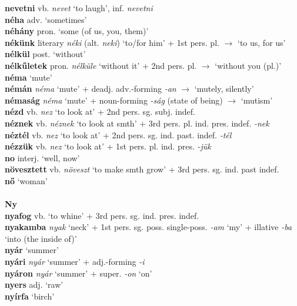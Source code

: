\documentclass[11pt]{article}
\begin{document}
\textbf{nevetni} vb. \emph{nevet} `to laugh', inf. \emph{nevetni} \\
\textbf{néha} adv. `sometimes' \\
\textbf{néhány} pron. `some (of us, you, them)' \\
\textbf{nékünk} literary \emph{néki} (alt. \emph{neki}) `to/for him' +
1st pers. pl. $\rightarrow$ `to us, for us' \\
\textbf{nélkül} post. `without' \\
\textbf{nélkűletek} pron. \emph{nélküle} `without it' + 2nd
pers. pl. $\rightarrow$ `without you (pl.)' \\
\textbf{néma} `mute' \\
\textbf{némán} \emph{néma} `mute' +
deadj. adv.\hyp{}forming \emph{-an} $\rightarrow$ `mutely, silently' \\
\textbf{némaság} \emph{néma} `mute' + noun\hyp{}forming \emph{-ság}
(state of being) $\rightarrow$ `mutism' \\
\textbf{nézd} vb. \emph{nez} `to look at' + 2nd
pers. sg. subj. indef. \\
\textbf{néznek} vb. \emph{néznek} `to look at smth' + 3rd
  pers. pl. ind. pres. indef. \emph{-nek} \\
\textbf{néztél} vb. \emph{nez} `to look at' + 2nd
pers. sg. ind. past. indef. \emph{-tél} \\
\textbf{nézzük} vb. \emph{nez} `to look at' + 1st
pers. pl. ind. pres. \emph{-jük} \\
\textbf{no} interj. `well, now' \\
\textbf{növesztett} vb. \emph{növeszt} `to make smth grow' + 3rd
pers. sg. ind. past indef. \\
\textbf{nő} `woman' \\
\ \\
\noindent \textbf{\large Ny} \\
\textbf{nyafog} vb. `to whine' + 3rd pers. sg. ind. pres. indef. \\
\textbf{nyakamba} \emph{nyak} `neck' + 1st
pers. sg. poss. single\hyp{}poss. \emph{-am} `my' +
illative \emph{-ba} `into (the inside of)' \\
\textbf{nyár} `summer' \\
\textbf{nyári} \emph{nyár} `summer' + adj.\hyp{}forming \emph{-i} \\
\textbf{nyáron} \emph{nyár} `summer' + super. \emph{-on} `on' \\
\textbf{nyers} adj. `raw' \\
\textbf{nyírfa} `birch' \\
\end{document}
